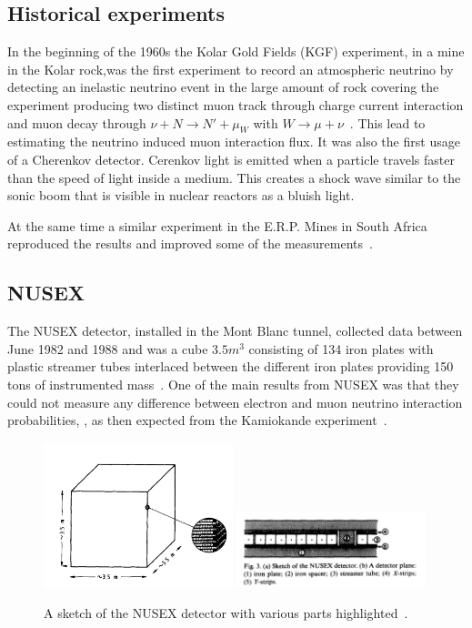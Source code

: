 \subsection{Historical experiments}
In the beginning of the 1960s the Kolar Gold Fields (KGF) experiment, in a mine in the Kolar rock,was the first experiment to record an atmospheric neutrino by detecting an inelastic neutrino event in the large amount of rock covering the experiment producing two distinct muon track through charge current interaction and muon decay through $\nu + N \rightarrow N' + \mu _ W$ with $W \rightarrow \mu + \nu$~\cite{55Narasimham}. This lead to estimating the neutrino induced muon interaction flux. It was also the first usage of a Cherenkov detector. Cerenkov light is emitted when a particle travels faster than the speed of light inside a medium. This creates a shock wave similar to the sonic boom that is visible in nuclear reactors as a bluish light.

At the same time a similar experiment in the E.R.P. Mines in South Africa reproduced the results and improved some of the measurements~\cite{55Narasimham}.

\subsection{NUSEX}
The NUSEX detector, installed in the Mont Blanc tunnel, collected data between June 1982 and 1988 and was a cube $3.5m^3$ consisting of 134 iron plates with plastic streamer tubes interlaced between the different iron plates providing 150 tons of instrumented mass~. One of the main results from NUSEX was that they could not measure any difference between electron and muon neutrino interaction probabilities, , as then expected from the Kamiokande experiment~\cite{56NUSEX, 57NUSEX}.

\begin{figure}[h!]
\centering
  \centering
\includegraphics[width=0.49\textwidth]{figures/nusex1.jpeg}
\includegraphics[width=0.49\textwidth]{figures/nusex2.jpeg}
\vspace{2mm}
\caption{A sketch of the NUSEX detector with various parts highlighted~\cite{56NUSEX}.}
\label{fig:nusex}
\end{figure}

